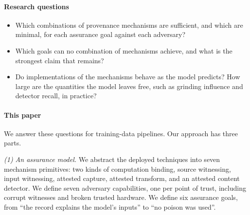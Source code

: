 \paragraph{Research questions}
\begin{itemize}
\item[\textbf{RQ1}] Which combinations of provenance mechanisms are sufficient, and which are
  minimal, for each assurance goal against each adversary?
\item[\textbf{RQ2}] Which goals can no combination of mechanisms achieve, and what is the
  strongest claim that remains?
\item[\textbf{RQ3}] Do implementations of the mechanisms behave as the model predicts? How
  large are the quantities the model leaves free, such as grinding influence and detector
  recall, in practice?
\end{itemize}

\paragraph{This paper}
We answer these questions for training-data pipelines. Our approach has three parts.

\emph{(1) An assurance model.} We abstract the deployed techniques into seven mechanism
primitives: two kinds of computation binding, source witnessing, input witnessing,
attested capture, attested transform, and an attested content detector. We define seven
adversary capabilities, one per point of trust, including corrupt witnesses and broken
trusted hardware. We define six assurance goals, from ``the record explains the model's
inputs'' to ``no poison was used''.

